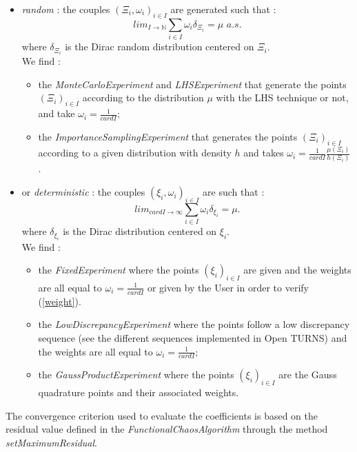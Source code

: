 \begin{itemize} 
  \item \emph{random} : the couples $(\Xi_i, \omega_i)_{i \in I}$ are generated such that : 
\begin{equation}
lim_{I \rightarrow \mathbb{N}} \sum_{i \in I} \omega_i \delta_{\Xi_i} = \mu \, \, a.s.
\end{equation}
where $\delta_{\Xi_i}$ is the Dirac random distribution centered on $\Xi_i$.\\
We find : 
\begin{itemize}
  \item the \emph{MonteCarloExperiment} and \emph{LHSExperiment} that generate the points $(\Xi_i)_{i \in I}$ according to the distribution $\mu$ with the LHS technique or not, and take $\omega_i = \displaystyle \frac{1}{card I}$;
  \item the \emph{ImportanceSamplingExperiment} that generates the points $(\Xi_i)_{i \in I}$according to a given distribution with density $h$ and  takes $\omega_i = \displaystyle \frac{1}{card I}\frac{\mu(\Xi_i)}{h(\Xi_i)}$.
\end{itemize}

  \item or \emph{deterministic} : the couples $(\xi_i, \omega_i)_{i \in I}$ are  such that : 
\begin{equation}\label{weight}
lim_{card I \rightarrow\infty} \sum_{i \in I} \omega_i \delta_{\xi_i} = \mu.
\end{equation}
where $\delta_{\xi_i}$ is the Dirac distribution centered on $\xi_i$.\\
We find : 
\begin{itemize}
  \item the \emph{FixedExperiment} where the points $(\xi_i)_{i \in I}$ are given and the weights are all equal to $\omega_i = \displaystyle \frac{1}{card I}$ or given by the User in order to verify (\ref{weight}).
  \item the \emph{LowDiscrepancyExperiment} where the points follow a  low discrepancy sequence (see the different sequences implemented in Open TURNS) and the weights are all equal to $\omega_i = \displaystyle \frac{1}{card I}$;
  \item the \emph{GaussProductExperiment} where the points $(\xi_i)_{i \in I}$ are the Gauss quadrature points and their associated weights.
\end{itemize}
\end{itemize} 


The convergence criterion used to evaluate the coefficients is based on the residual value defined in the {\itshape FunctionalChaosAlgorithm} through the method {\itshape setMaximumResidual}.\\

